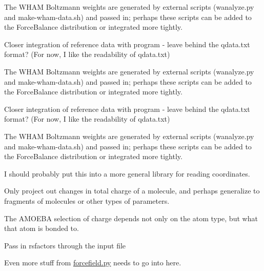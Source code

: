 \begin{DoxyRefList}
The W\-H\-A\-M Boltzmann weights are generated by external scripts (wanalyze.\-py and make-\/wham-\/data.\-sh) and passed in; perhaps these scripts can be added to the Force\-Balance distribution or integrated more tightly.

Closer integration of reference data with program -\/ leave behind the qdata.\-txt format? (For now, I like the readability of qdata.\-txt)

The W\-H\-A\-M Boltzmann weights are generated by external scripts (wanalyze.\-py and make-\/wham-\/data.\-sh) and passed in; perhaps these scripts can be added to the Force\-Balance distribution or integrated more tightly.

Closer integration of reference data with program -\/ leave behind the qdata.\-txt format? (For now, I like the readability of qdata.\-txt)

The W\-H\-A\-M Boltzmann weights are generated by external scripts (wanalyze.\-py and make-\/wham-\/data.\-sh) and passed in; perhaps these scripts can be added to the Force\-Balance distribution or integrated more tightly. 
\item[\label{todo__todo000006}%
\hypertarget{todo__todo000006}{}%
Member \hyperlink{classforcebalance_1_1counterpoise_1_1Counterpoise_a8795bd01b0f62b3f612e4e5c762f96f8}{forcebalance.counterpoise.Counterpoise.loadxyz} ]I should probably put this into a more general library for reading coordinates.  
\item[\label{todo__todo000008}%
\hypertarget{todo__todo000008}{}%
Member \hyperlink{classforcebalance_1_1forcefield_1_1FF_acf0ce8fc4e9fbf5257f93d14d4a4f10f}{forcebalance.forcefield.F\-F.mktransmat} ]Only project out changes in total charge of a molecule, and perhaps generalize to fragments of molecules or other types of parameters. 

The A\-M\-O\-E\-B\-A selection of charge depends not only on the atom type, but what that atom is bonded to.  
\item[\label{todo__todo000007}%
\hypertarget{todo__todo000007}{}%
Member \hyperlink{classforcebalance_1_1forcefield_1_1FF_a88715f96ff8e14c3c83b4f976ad147b4}{forcebalance.forcefield.F\-F.rsmake} ]Pass in rsfactors through the input file 
\item[\label{todo__todo000009}%
\hypertarget{todo__todo000009}{}%
Namespace \hyperlink{namespaceforcebalance_1_1gmxio}{forcebalance.gmxio} ]Even more stuff from \hyperlink{forcefield_8py}{forcefield.\-py} needs to go into here.


\end{DoxyRefList}
